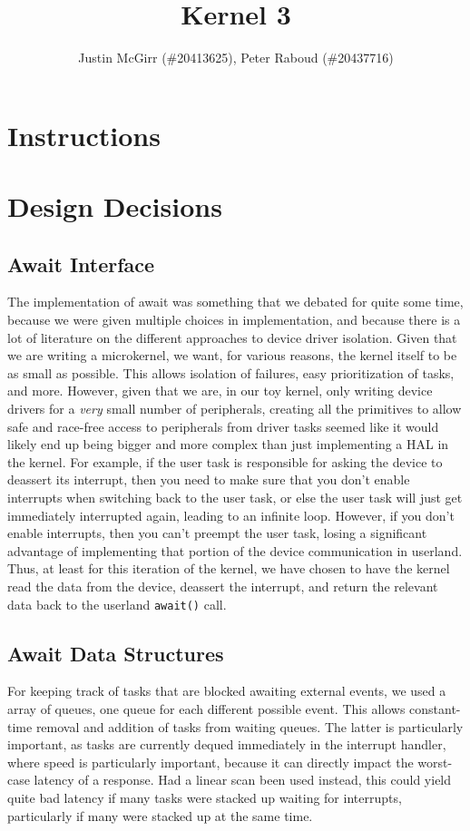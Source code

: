 \documentclass[titlepage]{article}
\begin{document}
\title{Kernel 3}
\author{Justin McGirr (\#20413625), Peter Raboud (\#20437716)}
\maketitle

\section{Instructions}


\section{Design Decisions}
\subsection{Await Interface}
The implementation of await was something that we debated for quite some time,
because we were given multiple choices in implementation, and because there is
a lot of literature on the different approaches to device driver isolation.
Given that we are writing a microkernel, we want, for various reasons, the
kernel itself to be as small as possible. This allows isolation of failures,
easy prioritization of tasks, and more. However, given that we are, in our toy
kernel, only writing device drivers for a \emph{very} small number of
peripherals, creating all the primitives to allow safe and race-free access
to peripherals from driver tasks seemed like it would likely end up being
bigger and more complex than just implementing a HAL in the kernel. For
example, if the user task is responsible for asking the device to deassert
its interrupt, then you need to make sure that you don't enable interrupts
when switching back to the user task, or else the user task will just get
immediately interrupted again, leading to an infinite loop. However, if you
don't enable interrupts, then you can't preempt the user task, losing a
significant advantage of implementing that portion of the device communication
in userland. Thus, at least for this iteration of the kernel, we have chosen
to have the kernel read the data from the device, deassert the interrupt,
and return the relevant data back to the userland \texttt{await()} call.

\subsection{Await Data Structures}
For keeping track of tasks that are blocked awaiting external events, we used
a array of queues, one queue for each different possible event. This allows
constant-time removal and addition of tasks from waiting queues. The latter
is particularly important, as tasks are currently dequed immediately in the
interrupt handler, where speed is particularly important, because it can
directly impact the worst-case latency of a response. Had a linear scan been
used instead, this could  yield quite bad latency if many tasks were stacked
up waiting for interrupts, particularly if many were stacked up at the same
time.
\end{document}
